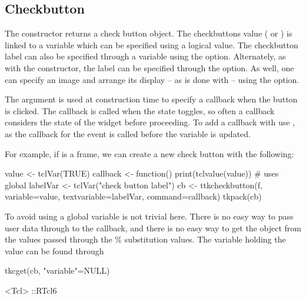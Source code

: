 \subsection{Checkbutton}
\label{sec:tcltk:checkboxes}

The  constructor returns a check button
object. The checkbuttons value ( or ) is linked
to a \TCL\/ variable which can be specified using a logical value.
The checkbutton label can also be specified through a \TCL\/ variable
using the  option.  Alternately,
as with the  constructor, the label can be specified
through the  option. As well, one can
specify an image and arrange its display -- as is done with
 -- using the 
option.

The  argument is used at construction
time to specify a callback when the button is clicked. The callback is
called when the state toggles, so often a callback considers the state
of the widget before proceeding.  To add a callback with
 use , as the callback
for the event  is called before the variable is
updated.

For example, if  is a frame, we can create a new check button
with the following:

\begin{Schunk}
\begin{Sinput}
 value <- tclVar(TRUE)
 callback <- function() print(tclvalue(value))     # uses global
 labelVar <- tclVar("check button label")
 cb <- ttkcheckbutton(f, variable=value, 
                      textvariable=labelVar, command=callback)
 tkpack(cb)
\end{Sinput}
\end{Schunk}

To avoid using a global variable is not trivial here. There is no easy
way to pass user data through to the callback, and there is no easy
way to get the \R\/ object from the values passed through the \%
substitution values. The variable holding the value can be found
through
\begin{Schunk}
\begin{Sinput}
 tkcget(cb, "variable"=NULL)
\end{Sinput}
\begin{Soutput}
<Tcl> ::RTcl6 
\end{Soutput}
\end{Schunk}

